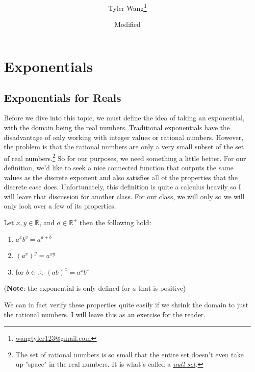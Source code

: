 \documentclass[11pt]{article}
\title{\mytitle \\ [2ex] \Large \mysubtitle}
\date{\small Modified \mydate}
\author {Tyler Wang\thanks{
\href{mailto:wangtyler123@gmail.com}{wangtyler123@gmail.com}}}
\numberwithin{lemma}{section}
\numberwithin{equation}{section}
\numberwithin{define}{section}
\numberwithin{prop}{section}
\numberwithin{figure}{section}
\numberwithin{theorem}{section}
\numberwithin{cor}{section}
\newcounter{ex}[section]
\numberwithin{ex}{section}
\def\real{\mathbb{R}}
\begin{document}
\maketitle
\section{Exponentials}
\subsection{Exponentials for Reals}
Before we dive into this topic, we must define the idea of taking an exponential, with the domain being the real numbers. Traditional exponentials have the disadvantage of only working with integer values or rational numbers.
However, the problem is that the rational numbers are only a very small subset of the set of real numbers.\footnote{
The set of rational numbers is so small that the entire set doesn't even take up "space" in the real numbers. It is what's called a \textit{\href{https://en.wikipedia.org/wiki/Null_set}{null set}.}}
So for our purposes, we need something a little better.
For our definition, we'd like to seek a nice connected function that outputs the same values as the discrete exponent and also satisfies all of the properties that the discrete case does.
Unfortunately, this definition is quite a calculus heavily so I will leave that discussion for another class. For our class, we will only so we will only look over a few of its properties.
\begin{theorem}
Let $x,y\in\real$, and $a\in\real^{+}$ then the following hold:
\begin{enumerate}
	\item $a^xb^y=a^{a+b}$
	\item $(a^x)^y=a^{xy}$
	\item for $b\in\real$, $(ab)^x=a^xb^x$
\end{enumerate}
(\textbf{Note}: the exponential is only defined for $a$ that is positive)
\end{theorem}

We can in fact verify these properties quite easily if we shrink the domain to just the rational numbers. I will leave this as an exercise for the reader.

\begin{figure}[h]
	\centering
	\caption{}
	\label{fig:exp}
\end{figure}
\end{document}
